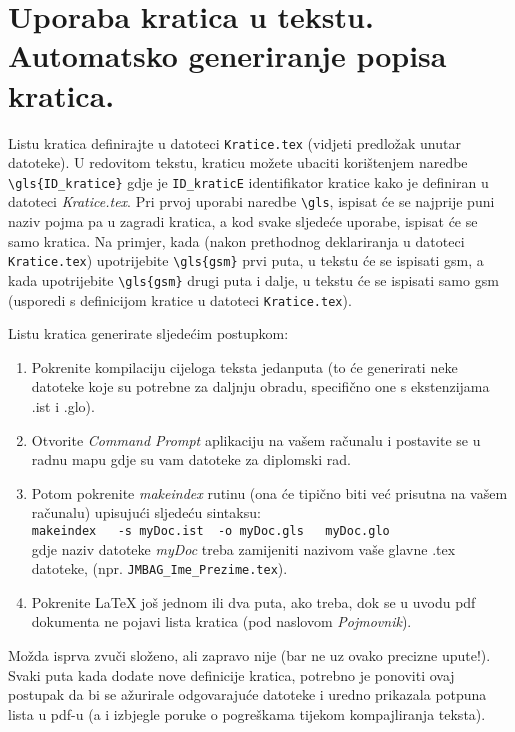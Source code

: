 \section{Uporaba kratica u tekstu. Automatsko generiranje popisa kratica.}  \label{sec:kratice}
Listu kratica definirajte u datoteci \verb|Kratice.tex| (vidjeti predložak unutar datoteke). U redovitom tekstu, kraticu  možete ubaciti korištenjem naredbe \verb|\gls{ID_kratice}| gdje je \verb|ID_kraticE| identifikator kratice kako je definiran u datoteci \emph{Kratice.tex}. Pri prvoj uporabi naredbe \verb|\gls|, ispisat će se najprije puni naziv pojma pa u zagradi kratica, a kod svake sljedeće uporabe, ispisat će se samo kratica. Na primjer, kada (nakon prethodnog deklariranja u datoteci \verb|Kratice.tex|) upotrijebite \verb|\gls{gsm}| prvi puta, u tekstu će se ispisati \gls{gsm}, a kada upotrijebite \verb|\gls{gsm}| drugi puta i dalje, u tekstu će se ispisati samo \gls{gsm} (usporedi s definicijom kratice u datoteci \verb|Kratice.tex|). 
 
{\color{red} Listu kratica generirate sljedećim postupkom:} \label{generiranje_liste_kratica}
\begin{enumerate}
	\item Pokrenite kompilaciju cijeloga teksta jedanputa (to će generirati neke datoteke koje su potrebne za daljnju obradu, specifično one s ekstenzijama .ist i .glo).
	\item Otvorite \emph{Command Prompt} aplikaciju na vašem računalu i postavite se u radnu mapu gdje su vam datoteke za diplomski rad. 
	\item Potom pokrenite \emph{makeindex} rutinu (ona će tipično biti već prisutna na vašem računalu) upisujući sljedeću sintaksu: \\
	\verb|makeindex   -s myDoc.ist  -o myDoc.gls   myDoc.glo| \\
	gdje naziv datoteke \emph{myDoc} treba zamijeniti nazivom vaše glavne .tex datoteke, (npr. \verb|JMBAG_Ime_Prezime.tex|).
	\item Pokrenite \LaTeX{} još jednom ili dva puta, ako treba, dok se u uvodu pdf dokumenta ne pojavi lista kratica (pod naslovom \emph{Pojmovnik}).	
\end{enumerate}

Možda isprva zvuči složeno, ali zapravo nije (bar ne uz ovako precizne upute!). Svaki puta kada dodate nove definicije kratica, potrebno je ponoviti ovaj postupak da bi se ažurirale odgovarajuće datoteke i uredno prikazala potpuna lista u pdf-u (a i izbjegle poruke o pogreškama tijekom kompajliranja teksta). 

